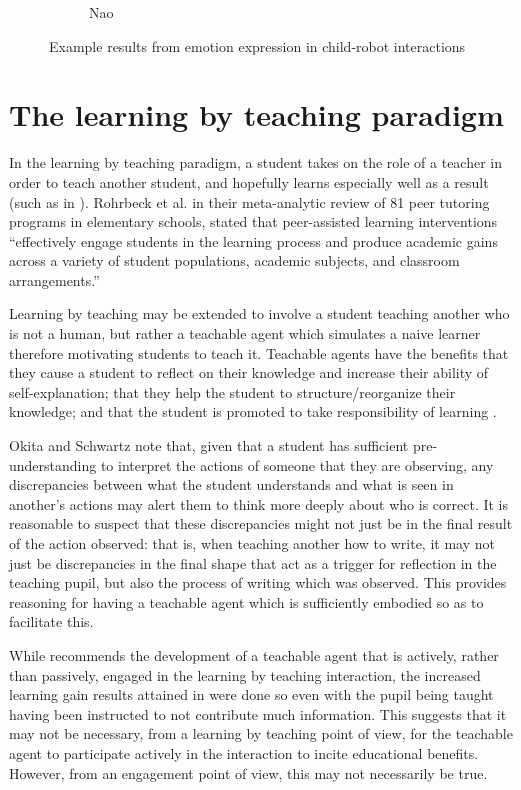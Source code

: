 \begin{figure}[h!]
\begin{subfigure}[b]{0.3\textwidth}
                \caption{Nao}
                \label{fig:int3}
        \end{subfigure}
        \caption{Example results from emotion expression in child-robot interactions}\label{fig:animals}
\end{figure}

\section{The learning by teaching paradigm} \label{learningby}

In the learning by teaching paradigm, a student takes on the role of a teacher in order to teach
another student, and hopefully learns especially well as a result (such as in \cite{palinscar1984reciprocal}). Rohrbeck et al. \cite{rohrbeck2003peer} in their meta-analytic review of 81 peer tutoring programs in elementary schools, stated that peer-assisted learning interventions “effectively engage students in the learning process and produce academic gains across a variety of student populations, academic subjects, and classroom arrangements.”

Learning by teaching may be extended to involve a student teaching another who is not
a human, but rather a teachable agent which simulates a naive learner therefore motivating
students to teach it. Teachable agents have the benefits that they cause a student to reflect
on their knowledge and increase their ability of self-explanation; that they help the student to
structure/reorganize their knowledge; and that the student is promoted to take responsibility
of learning \cite{zhao2012learning}.

Okita and Schwartz \cite{okita2006observation} note that, given that a student has sufficient pre-understanding to interpret the actions of someone that they are observing, any discrepancies between what the student understands and what is seen in another’s actions may alert them to think more deeply about who is correct. It is reasonable to suspect that these discrepancies might not just be in the final result of the action observed: that is, when teaching another how to write, it may not just
be discrepancies in the final shape that act as a trigger for reflection in the teaching pupil, but
also the process of writing which was observed. This provides reasoning for having a teachable
agent which is sufficiently embodied so as to facilitate this.

While \cite{zhao2012learning} recommends the development of a teachable agent that is actively, rather than passively, engaged in the learning by teaching interaction, the increased learning gain results attained in \cite{okita2006observation} were done so even with the pupil being taught having been instructed to not contribute much information. This suggests that it may not be necessary, from a learning by teaching point of view, for the teachable agent to participate actively in the interaction to incite educational benefits. However, from an engagement point of view, this may not necessarily be true.

